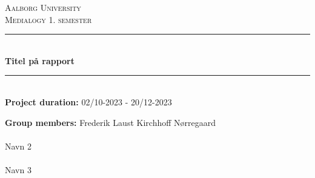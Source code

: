 \documentclass[main.tex]{subfiles}
\begin{document}

\begin{titlepage}
\begin{center}

\textsc{\Large Aalborg University}\\[1 cm]

\textsc{Medialogy 1. semester}\\[0.5cm]



 \rule{\linewidth}{0.5mm}\\[0.4cm]
 { \LARGE \bfseries Titel på rapport \\[0.4cm]}
 \rule{\linewidth}{0.5mm}\\[1.2cm]

 \textbf{Project duration:} 02/10-2023 - 20/12-2023 


\textbf{Group members:} 
Frederik Laust Kirchhoff Nørregaard \\ \mbox{}\\
Navn 2 \\ \mbox{}\\
Navn 3

\end{center}
\end{titlepage}
\end{document}
